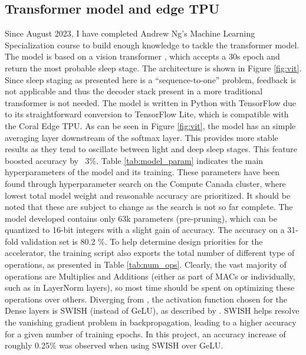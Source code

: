 \documentclass[12pt, hidelinks]{article}
\begin{document}
    \subsection{Transformer model and edge TPU}
    Since August 2023, I have completed Andrew Ng's Machine Learning Specialization course to build enough knowledge to tackle the transformer model. The model is based on a vision transformer \cite{dosovitskiy2010image}, which accepts a 30s epoch and return the most probable
    sleep stage. The architecture is shown in Figure \ref{fig:vit}. Since sleep staging as presented here is a ``sequence-to-one'' problem, feedback is not applicable and thus the decoder stack present in a more traditional transformer is not needed. The model is written in
    Python with TensorFlow due to its straightforward conversion to TensorFlow Lite, which is compatible with the Coral Edge TPU. As can be seen in Figure \ref{fig:vit}, the model has an simple averaging layer downstream of the softmax layer. This provides more stable results
    as they tend to oscillate between light and deep sleep stages. This feature boosted accuracy by ~3\%. Table \ref*{tab:model_param} indicates the main hyperparameters of the model and its training. These parameters have been found through hyperparameter search on the Compute
    Canada cluster, where lowest total model weight and reasonable accuracy are prioritized. It should be noted that these are subject to change as the search is not so far complete. The model developed contains only 63k parameters (pre-pruning), which can be quantized to 
    16-bit integers with a slight gain of accuracy. The accuracy on a 31-fold validation set is 80.2 \%. To help determine design priorities for the accelerator, the training script also exports the total number of different type of operations, as presented in Table \ref{tab:num_ops}.
    Clearly, the vast majority of operations are Multiplies and Additions (either as part of MACs or individually, such as in LayerNorm layers), so most time should be spent on optimizing these operations over others. Diverging from \cite{dosovitskiy2010image}, the activation
    function chosen for the Dense layers is SWISH (instead of GeLU), as described by \cite*{ramachandran2017searching}. SWISH helps resolve the vanishing gradient problem in backpropagation, leading to a higher accuracy for a given number of training epochs. In this project, an
    accuracy increase of roughly 0.25\% was observed when using SWISH over GeLU.
\end{document}
